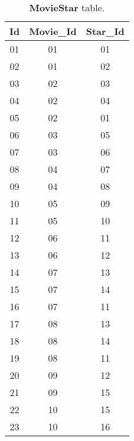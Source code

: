 	\begin{table}[H]
		\begin{center}
			\begin{tabular}{|c|c|c|}
				\hline
				\textbf{Id} & \textbf{Movie\_Id} & \textbf{Star\_Id} \\ \hline
				01 & 01 & 01 \\ \hline
				02 & 01 & 02 \\ \hline
				03 & 02 & 03 \\ \hline
				04 & 02 & 04 \\ \hline
				05 & 02 & 01 \\ \hline
				06 & 03 & 05 \\ \hline
				07 & 03 & 06 \\ \hline
				08 & 04 & 07 \\ \hline
				09 & 04 & 08 \\ \hline
				10 & 05 & 09 \\ \hline
				11 & 05 & 10 \\ \hline
				12 & 06 & 11 \\ \hline
				13 & 06 & 12 \\ \hline
				14 & 07 & 13 \\ \hline
				15 & 07 & 14 \\ \hline
				16 & 07 & 11 \\ \hline
				17 & 08 & 13 \\ \hline
				18 & 08 & 14 \\ \hline
				19 & 08 & 11 \\ \hline
				20 & 09 & 12 \\ \hline
				21 & 09 & 15 \\ \hline
				22 & 10 & 15 \\ \hline
				23 & 10 & 16 \\ \hline
			\end{tabular}
			\caption{\textbf{MovieStar} table.}
		\end{center}
	\end{table}

